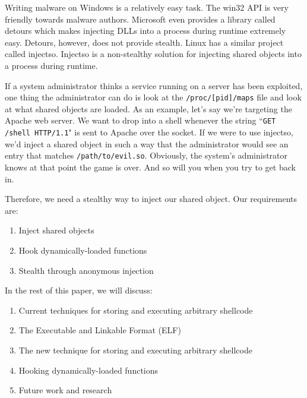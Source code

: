 Writing malware on Windows is a relatively easy task. The win32 API is very friendly
towards malware authors. Microsoft even provides a library called detours which makes
injecting DLLs into a process during runtime extremely easy. Detours, however, does
not provide stealth. Linux has a similar project called injectso. Injectso is a
non-stealthy solution for injecting shared objects into a process during runtime.

If a system administrator thinks a service running on a server has been exploited,
one thing the administrator can do is look at the \texttt{/proc/[pid]/maps} file and
look at what shared objects are loaded. As an example, let's say we're targeting the
Apache web server. We want to drop into a shell whenever the string
``\texttt{GET /shell HTTP/1.1}" is sent to Apache over the socket. If we were to
use injectso, we'd inject a shared object in such a way that the administrator
would see an entry that matches \texttt{/path/to/evil.so}. Obviously, the system's
administrator knows at that point the game is over. And so will you when you try
to get back in.

Therefore, we need a stealthy way to inject our shared object. Our requirements are:
\begin{enumerate}
\item{Inject shared objects}
\item{Hook dynamically-loaded functions}
\item{Stealth through anonymous injection}
\end{enumerate}

In the rest of this paper, we will discuss:
\begin{enumerate}
\item{Current techniques for storing and executing arbitrary shellcode}
\item{The Executable and Linkable Format (ELF)}
\item{The new technique for storing and executing arbitrary shellcode}
\item{Hooking dynamically-loaded functions}
\item{Future work and research}
\end{enumerate}
